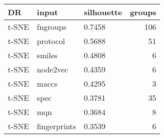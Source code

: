 \begin{tabular}{lllr}
\toprule
    DR &         input & silhouette &  groups \\
\midrule
 t-SNE &      fngroups &     0.7458 &     106 \\
 t-SNE &      protocol &     0.5688 &      51 \\
 t-SNE &        smiles &     0.4808 &       6 \\
 t-SNE &      node2vec &     0.4359 &       6 \\
 t-SNE &         maccs &     0.4295 &       3 \\
 t-SNE &          spec &     0.3781 &      35 \\
 t-SNE &           mqn &     0.3684 &       8 \\
 t-SNE &  fingerprints &     0.3539 &       6 \\
\bottomrule
\end{tabular}